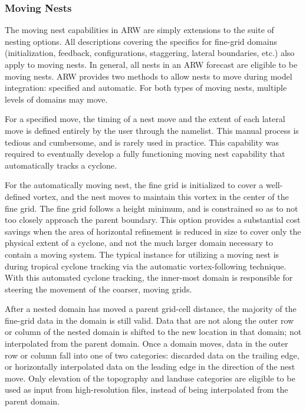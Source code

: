 \subsubsection{Moving Nests}

The moving nest capabilities in ARW are simply extensions to the 
suite of nesting options.  All descriptions covering the 
specifics for fine-grid
domains (initialization, feedback, configurations, staggering,
lateral boundaries, etc.) also apply to moving nests.  In
general, all nests
in an ARW forecast are eligible to be moving nests.  ARW
provides two methods to allow nests to move during model
integration: specified and automatic.
For both types of moving nests,
multiple levels of domains may move.  

For a specified move, the timing of a nest move and the extent
of each lateral move is defined entirely by the user through
the namelist. This manual process is tedious and cumbersome, and is 
rarely used in practice. This capability was required to eventually
develop a fully functioning moving nest capability that automatically 
tracks a cyclone.  

For the
automatically moving nest, the fine grid is initialized to cover
a well-defined vortex, and the nest moves to maintain this vortex
in the center of the fine grid. The fine grid follows a height 
minimum, and is constrained so as to not too closely approach 
the parent boundary. This option provides a substantial cost savings
when the area of horizontal refinement is reduced in 
size to cover only the physical extent of a cyclone, and not the 
much larger domain necessary to contain a moving system.
The typical instance for utilizing a moving nest is during tropical
cyclone tracking via the automatic vortex-following technique.
With this automated cyclone tracking, the inner-most domain
is responsible for steering the movement of the coarser, moving grids.

After a nested domain has moved a parent grid-cell distance,
the majority of the fine-grid data in the domain is still valid.  Data 
that are not along the outer row or column of the nested
domain is shifted to the new location in that domain; not interpolated
from the parent domain.
Once a domain moves, data in the outer
row or column fall into one of two categories: discarded data on the
trailing edge, or horizontally interpolated data on the
leading edge in the direction of the nest move. 
Only elevation of the topography and landuse categories are eligible
to be used as input from high-resolution files, instead of being interpolated
from the parent domain.

